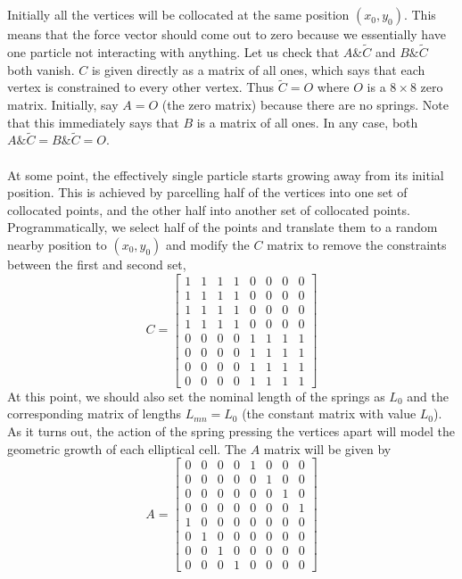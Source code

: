\\
\\
Initially all the vertices will be
collocated at the same position $(x_0,y_0)$. This means that the force vector should come out to zero because
we essentially have one particle not interacting with anything. Let us check that $A  {\&}  \tilde{C}$ and 
$B  {\&}  \tilde{C}$ both vanish. $C$ is given directly as a matrix of all ones, which says that each vertex
is constrained to every other vertex. Thus $\tilde{C} = O$ where $O$ is a  $8 \times 8$ zero matrix. 
Initially, say $A = O$ (the zero matrix) because there are no springs. Note that this immediately says that 
$B$ is a matrix of all ones. In any case, both $A  {\&}  \tilde{C} = B  {\&}  \tilde{C} = O$.
\\
\\
At some point, the effectively single particle starts growing away from its initial position. This is 
achieved by parcelling half of the vertices into one set of collocated points, and the other half
into another set of collocated points. Programmatically, we select half of the points
and translate them to a random nearby position to $(x_0,y_0)$ and modify the $C$ matrix to remove
the constraints between the first and second set,
\begin{equation*}
    C = 
    \begin{bmatrix}
    1 & 1 & 1 & 1 & 0 & 0 & 0 & 0 \\
    1 & 1 & 1 & 1 & 0 & 0 & 0 & 0 \\
    1 & 1 & 1 & 1 & 0 & 0 & 0 & 0 \\
    1 & 1 & 1 & 1 & 0 & 0 & 0 & 0 \\
    0 & 0 & 0 & 0 & 1 & 1 & 1 & 1 \\
    0 & 0 & 0 & 0 & 1 & 1 & 1 & 1 \\
    0 & 0 & 0 & 0 & 1 & 1 & 1 & 1 \\
    0 & 0 & 0 & 0 & 1 & 1 & 1 & 1 
    \end{bmatrix}
\end{equation*}
At this point, we should also set the nominal length of the springs as $L_0$ and the corresponding
matrix of lengths $L_{mn} = L_0$ (the constant matrix with value $L_0$). As it turns out, the action
of the spring pressing the vertices apart will model the geometric growth of each elliptical cell.
The $A$ matrix will be given by
\begin{equation*}
    A = 
    \begin{bmatrix}
    0 & 0 & 0 & 0 & 1 & 0 & 0 & 0 \\
    0 & 0 & 0 & 0 & 0 & 1 & 0 & 0 \\
    0 & 0 & 0 & 0 & 0 & 0 & 1 & 0 \\
    0 & 0 & 0 & 0 & 0 & 0 & 0 & 1 \\
    1 & 0 & 0 & 0 & 0 & 0 & 0 & 0 \\
    0 & 1 & 0 & 0 & 0 & 0 & 0 & 0 \\
    0 & 0 & 1 & 0 & 0 & 0 & 0 & 0 \\
    0 & 0 & 0 & 1 & 0 & 0 & 0 & 0 
    \end{bmatrix}
\end{equation*}
